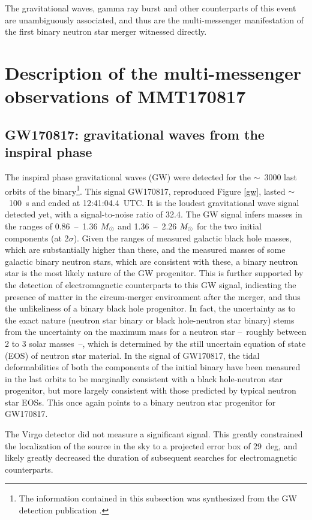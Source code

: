 The gravitational waves, gamma ray burst and other counterparts of this event are unambiguously associated, and thus are the multi-messenger manifestation of the first binary neutron star merger witnessed directly.

\section{Description of the multi-messenger observations of MMT170817}

\subsection{GW170817: gravitational waves from the inspiral phase}

The inspiral phase gravitational waves (GW) were detected for the $\sim$~3000 last orbits of the binary\footnote{The information contained in this subsection was synthesized from the GW detection publication \citep{23}.}. This signal GW170817, reproduced Figure \ref{gw}, lasted $\sim$~100~s and ended at 12:41:04.4~UTC. It is the loudest gravitational wave signal detected yet, with a signal-to-noise ratio of 32.4. The GW signal infers masses in the ranges of 0.86~--~1.36 $M_{\odot}$ and 1.36~--~2.26 $M_{\odot}$ for the two initial components (at 2$\sigma$). Given the ranges of measured galactic black hole masses, which are substantially higher than these, and the measured masses of some galactic binary neutron stars, which are consistent with these, a binary neutron star is the most likely nature of the GW progenitor. This is further supported by the detection of electromagnetic counterparts to this GW signal, indicating the presence of matter in the circum-merger environment after the merger, and thus the unlikeliness of a binary black hole progenitor. In fact, the uncertainty as to the exact nature (neutron star binary or black hole-neutron star binary) stems from the uncertainty on the maximum mass for a neutron star --~roughly between 2 to 3 solar masses~--, which is determined by the still uncertain equation of state (EOS) of neutron star material. In the signal of GW170817, the tidal deformabilities of both the components of the initial binary have been measured in the last orbits to be marginally consistent with a black hole-neutron star progenitor, but more largely consistent with those predicted by typical neutron star EOSs. This once again points to a binary neutron star progenitor for GW170817.

The Virgo detector did not measure a significant signal. This greatly constrained the localization of the source in the sky to a projected error box of 29~deg, and likely greatly decreased the duration of subsequent searches for electromagnetic counterparts.


